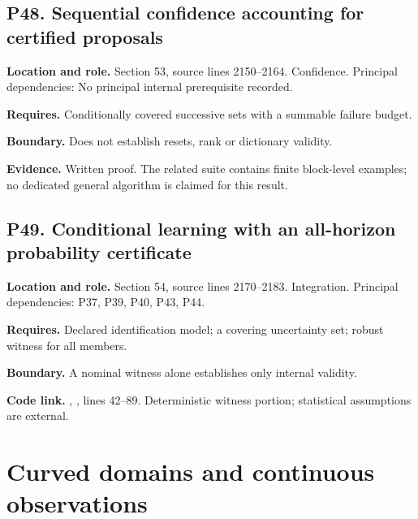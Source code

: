 \documentclass[11pt,oneside,openany]{book}
\numberwithin{equation}{section}
\begin{document}
\par\noindent\begin{minipage}{\textwidth}
\subsection{P48. Sequential confidence accounting for certified
proposals}\label{LSMRegister:p48.-sequential-confidence-accounting-for-certified-proposals}

\textbf{Location and role.} Section 53, source lines 2150--2164.
Confidence. Principal dependencies: No principal internal prerequisite
recorded.

\textbf{Requires.} Conditionally covered successive sets with a summable
failure budget.

\textbf{Boundary.} Does not establish resets, rank or dictionary
validity.

\textbf{Evidence.} Written proof. The related suite contains finite
block-level examples; no dedicated general algorithm is claimed for this
result.
\end{minipage}\par\medskip

\par\noindent\begin{minipage}{\textwidth}
\subsection{P49. Conditional learning with an all-horizon probability
certificate}\label{LSMRegister:p49.-conditional-learning-with-an-all-horizon-probability-certificate}

\textbf{Location and role.} Section 54, source lines 2170--2183.
Integration. Principal dependencies: P37, P39, P40, P43, P44.

\textbf{Requires.} Declared identification model; a covering uncertainty
set; robust witness for all members.

\textbf{Boundary.} A nominal witness alone establishes only internal
validity.

\textbf{Code link.} ,
, lines 42--89. Deterministic witness
portion; statistical assumptions are external.
\end{minipage}\par\medskip


\section{Curved domains and continuous
observations}\label{LSMRegister:curved-domains-and-continuous-observations}
\end{document}
